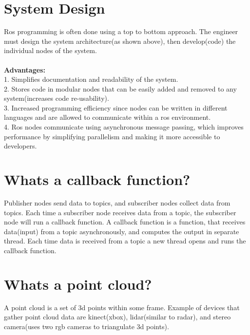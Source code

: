 \documentclass{article}
\begin{document}
\section{System Design}
Ros programming is often done using a top to bottom approach. The engineer must design the system architecture(as shown above), then develop(code) the individual nodes of the system.\\\\
\textbf{Advantages:} \\
1. Simplifies documentation and readability of the system.\\
2. Stores code in modular nodes that can be easily added and removed to any system(increases code re-usability).\\
3. Increased programming efficiency since nodes can be written in different languages and are allowed to communicate within a ros environment.\\
4. Ros nodes communicate using asynchronous message passing, which improves performance by simplifying parallelism and making it more accessible to developers.

\section{Whats a callback function?}
Publisher nodes send data to topics, and subscriber nodes collect data from topics. Each time a subscriber node receives data from a topic, the subscriber node will run a callback function. A callback function is a function, that receives data(input) from a topic asynchronously, and computes the output in separate thread. Each time data is received from a topic a new thread opens and runs the callback function. 

\section{Whats a point cloud?}
A point cloud is a set of 3d points within some frame. Example of devices that gather point cloud data are kinect(xbox), lidar(similar to radar), and stereo camera(uses two rgb cameras to triangulate 3d points). 
\end{document}
